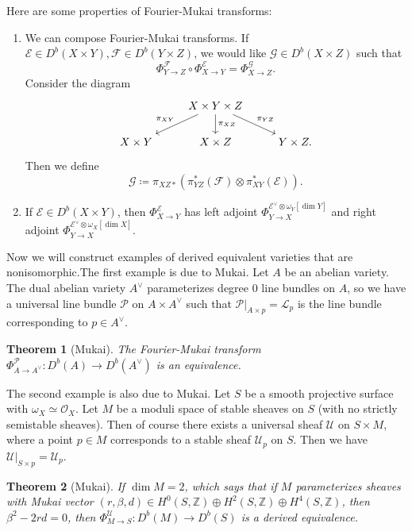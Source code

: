 \documentclass{amsart}
\newtheorem{thm}{Theorem}[section]
\theoremstyle{definition}
\theoremstyle{remark}
\theoremstyle{plain}
\theoremstyle{definition}
\theoremstyle{remark}
\newcommand{\Z}{\mathbb{Z}}
\newcommand{\mc}[1]{\mathcal{#1}}
\newcommand{\1}{\mathbf{1}}
\newcommand{\2}{\mathbf{2}}
\newcommand{\3}{\mathbf{3}}
\begin{document}
Here are some properties of Fourier-Mukai transforms:
\begin{enumerate}
    \item We can compose Fourier-Mukai transforms. If $\mc{E} \in D^b(X \times Y), \mc{F} \in D^b(Y \times Z)$, we would like $\mc{G} \in D^b(X \times Z)$ such that
        \[ \Phi_{Y \to Z}^{\mc{F}} \circ \Phi_{X \to Y}^{\mc{E}} = \Phi_{X \to Z}^{\mc{G}}. \]
        Consider the diagram
        \begin{equation*}
        \begin{tikzcd}
            & X \times Y \times Z \ar[swap]{dl}{\pi_{XY}} \ar{d}{\pi_{XZ}} \ar{dr}{\pi_{YZ}} \\
            X \times Y & X \times Z & Y \times Z.
        \end{tikzcd}
        \end{equation*}
        Then we define 
        \[ \mc{G} \coloneqq \pi_{XZ*} (\pi_{YZ}^*(\mc{F}) \otimes \pi_{XY}^*(\mc{E})). \]
    \item If $\mc{E} \in D^b(X \times Y)$, then $\Phi_{X \to Y}^{\mc{E}}$ has left adjoint $\Phi^{\mc{E}^{\vee} \otimes \omega_Y[\dim Y]}_{Y \to X}$ and right adjoint $\Phi_{Y \to X}^{\mc{E}^{\vee} \otimes \omega_X[\dim X]}$.
\end{enumerate}

Now we will construct examples of derived equivalent varieties that are nonisomorphic.The first example is due to Mukai. Let $A$ be an abelian variety. The dual abelian variety $A^{\vee}$ parameterizes degree $0$ line bundles on $A$, so we have a universal line bundle $\mc{P}$ on $A \times A^{\vee}$ such that $\mc{P}|_{A \times p} = \mc{L}_p$ is the line bundle corresponding to $p \in A^{\vee}$.

\begin{thm}[Mukai]
    The Fourier-Mukai transform $\Phi_{A \to A^{\vee}}^{\mc{P}} \colon D^b(A) \to D^b(A^{\vee})$ is an equivalence.
\end{thm}

The second example is also due to Mukai. Let $S$ be a smooth projective surface with $\omega_X \simeq \mc{O}_X$. Let $M$ be a moduli space of stable sheaves on $S$ (with no strictly semistable sheaves). Then of course there exists a universal sheaf $\mc{U}$ on $S \times M$, where a point $p \in M$ corresponds to a stable sheaf $\mc{U}_p$ on $S$. Then we have $\mc{U}|_{S \times p} = \mc{U}_p$. 

\begin{thm}[Mukai]
    If $\dim M = 2$, which says that if $M$ parameterizes sheaves with Mukai vector $(r, \beta, d) \in H^0(S, \Z) \oplus H^2(S, \Z) \oplus H^4(S, \Z)$, then $\beta^2 - 2rd = 0$, then $\Phi_{M \to S}^{\mc{U}} \colon D^b(M) \to D^b(S)$ is a derived equivalence.
\end{thm}
\end{document}
